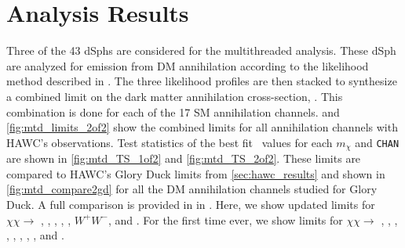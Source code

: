 \section{Analysis Results}\label{sec:mtd_results}

Three of the 43 \LS dSphs are considered for the multithreaded analysis.
These dSph are analyzed for emission from DM annihilation according to the likelihood method described in .
The three likelihood profiles are then stacked to synthesize a combined limit on the dark matter annihilation cross-section, \sv.
This combination is done for each of the 17 SM annihilation channels.
 and \cref{fig:mtd_limits_2of2} show the combined limits for all annihilation channels with HAWC's observations.
Test statistics of the best fit \sv~values for each $m_\chi$ and \texttt{CHAN} are shown in \cref{fig:mtd_TS_1of2} and \cref{fig:mtd_TS_2of2}.
These limits are compared to HAWC's Glory Duck limits from \cref{sec:hawc_results} and shown in \cref{fig:mtd_compare2gd} for all the DM annihilation channels studied for Glory Duck.
A full comparison is provided in  in .
Here, we show updated limits for $\chi\chi \rightarrow$ , , \parpar{\mu}, \parpar{\tau}, , $W^+W^-$, \pp{\gamma} and .
For the first time ever, we show limits for $\chi\chi \rightarrow$ , , , , , \parpar{\nu_\mu}, \parpar{\nu_\tau}, , and .

